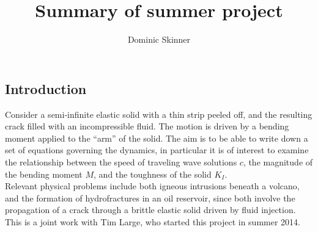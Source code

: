 \documentclass[11pt]{article}
\begin{document}
\title{Summary of summer project}

\author{Dominic Skinner}
\date{}
\maketitle
{}
\subsection*{Introduction}
\vspace{-6pt}
Consider a semi-infinite elastic solid with a thin strip peeled off, and the
resulting crack filled with an incompressible fluid. The motion is driven
by a bending moment applied to the ``arm'' of the solid. The aim is to be
able to write down a set of equations governing the dynamics, in particular
it is of interest to examine the relationship between the speed of traveling
wave solutions $c$, the magnitude of the bending moment $M$, and the toughness 
of the solid $K_I$. 
\\[7pt]
Relevant physical problems include both igneous intrusions beneath a volcano,
and the formation of hydrofractures in an oil
reservoir, since both involve the propagation of a crack through a brittle 
elastic solid driven by fluid injection.
\\[7pt]
This is a joint work with Tim Large, who started this project in
summer 2014.
\vspace{-4pt}
\end{document}
